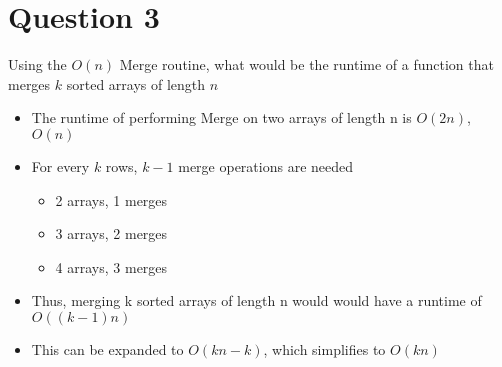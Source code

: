 \documentclass{report}
\begin{document}
    \section{Question 3}
    Using the $O(n)$ Merge routine, what would be the runtime of a function that merges $k$ sorted arrays of length $n$
        \begin{itemize}
            \item{The runtime of performing Merge on two arrays of length n is $O(2n)$, $O(n)$}
            \item{For every $k$ rows, $k - 1$ merge operations are needed}
                \begin{itemize}
                    \item{2 arrays, 1 merges}
                    \item{3 arrays, 2 merges}
                    \item{4 arrays, 3 merges}
                \end{itemize}
            \item{Thus, merging k sorted arrays of length n would would have a runtime of $O((k-1)n)$}
            \item{This can be expanded to $O(kn - k)$, which simplifies to \textbf{$O(kn)$}}
        \end{itemize}
\end{document}
